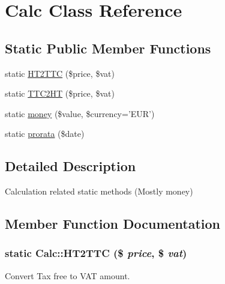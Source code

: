 \hypertarget{classCalc}{
\section{Calc Class Reference}
\label{classCalc}
}
\subsection*{Static Public Member Functions}
\begin{CompactItemize}
\item 
static \hyperlink{classCalc_5654689f9bf3c43030b6ee27806c718a}{HT2TTC} (\$price, \$vat)
\item 
static \hyperlink{classCalc_5fd87cac52c2cc34fb22fcb732f5ee21}{TTC2HT} (\$price, \$vat)
\item 
static \hyperlink{classCalc_6e330532dcf40889cc96f09dcdcba7b4}{money} (\$value, \$currency='EUR')
\item 
static \hyperlink{classCalc_9d9aafb8e61efce896ca20bc0d2a32e3}{prorata} (\$date)
\end{CompactItemize}


\subsection{Detailed Description}
Calculation related static methods (Mostly money) 

\subsection{Member Function Documentation}
\hypertarget{classCalc_5654689f9bf3c43030b6ee27806c718a}{
\subsubsection[HT2TTC]{\setlength{\rightskip}{0pt plus 5cm}static Calc::HT2TTC (\$ {\em price}, \/  \$ {\em vat})}}
\label{classCalc_5654689f9bf3c43030b6ee27806c718a}


Convert Tax free to VAT amount.

